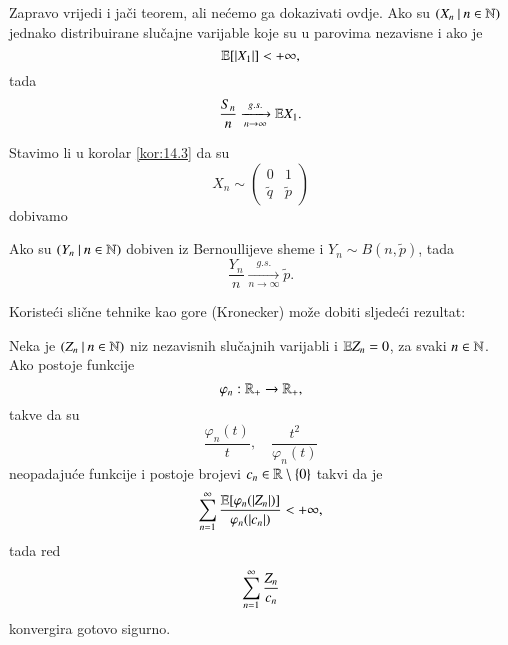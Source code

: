 \begin{nap} \label{nap:14.5}
    Zapravo vrijedi i ja\v ci teorem, ali ne\' cemo ga dokazivati ovdje.
    Ako su $({X_n} \: | \: {n \in \mathbb{N}})$ jednako distribuirane slu\v cajne varijable koje su u parovima nezavisne i ako je
    \begin{equation*}
        \mathbb{E} [ |X_1| ] < +\infty,
    \end{equation*}
    tada
    \begin{equation*}
        \frac{S_n}{n} \xrightarrow[n \to \infty]{g.s.} \mathbb{E} X_1.
    \end{equation*}
\end{nap}

Stavimo li u korolar \ref{kor:14.3} da su
\begin{equation*}
    X_n \sim
    \begin{pmatrix}
        0 & 1\\
        \tilde{q} & \tilde{p}
    \end{pmatrix}
\end{equation*}
dobivamo

\begin{kor} \label{kor:14.6}
    Ako su $({Y_n} \: | \: {n \in \mathbb{N}})$ dobiven iz Bernoullijeve sheme i $Y_n \sim B(n, \tilde{p})$, tada
    \begin{equation*}
        \frac{Y_n}{n} \xrightarrow[n \to \infty]{g.s.} \tilde{p}.
    \end{equation*}
\end{kor}

Koriste\' ci sli\v cne tehnike kao gore (Kronecker) mo\v ze dobiti sljede\' ci rezultat:

\begin{tm}  \label{tm:14.6-1}
    Neka je $({Z_n} \: | \: {n \in \mathbb{N}})$ niz nezavisnih slu\v cajnih varijabli i $\mathbb{E} Z_n = 0$, za svaki $n \in \mathbb{N}$.
    Ako postoje funkcije
    \begin{equation*}
        \varphi_n : \mathbb{R}_+ \to \mathbb{R}_+,
    \end{equation*}
    takve da su
    \begin{equation*}
        \frac{\varphi_n (t)}{t}, \quad \frac{t^2}{\varphi_n (t)}
    \end{equation*}
    neopadaju\' ce funkcije i postoje brojevi $c_n \in \mathbb{R} \setminus \{0\}$ takvi da je
    \begin{equation*}
        \sum\limits_{n = 1}^{\infty} \frac{\mathbb{E} [ \varphi_n (|Z_n|) ]}{\varphi_n (|c_n|)} < +\infty,
    \end{equation*}
    tada red
    \begin{equation*}
        \sum\limits_{n = 1}^{\infty} \frac{Z_n}{c_n}
    \end{equation*}
    konvergira gotovo sigurno.
\end{tm}

